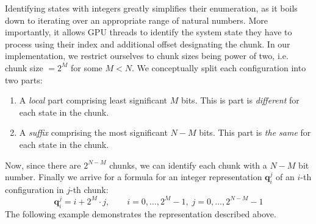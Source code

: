 Identifying states with integers greatly simplifies their enumeration, as it
boils down to iterating over an appropriate range of natural numbers. More
importantly, it allows GPU threads to identify the system state they have to
process using their index and additional offset designating the chunk. In our
implementation, we restrict ourselves to chunk sizes being power of two, i.e.
chunk size $=2^{M}$ for some $M < N$. We conceptually split each configuration
    into two parts:
    \begin{enumerate}
      \item A \emph{local} part comprising least significant $M$ bits. This is part is
        \emph{different} for each state in the chunk.
      \item A \emph{suffix} comprising the most significant $N-M$ bits. This part is
        \emph{the same} for each state in the chunk.
    \end{enumerate}
    Now, since there are $2^{N-M}$ chunks, we can identify each chunk with a $N-M$
    bit number. Finally we arrive for a formula for an integer representation
  $\mathbf{q}_{i}^{j}$ of an $i$-th configuration in $j$-th chunk:
\begin{equation}
  \mathbf{q}_{i}^{j} = i + 2^{M}\cdot j,\qquad i=0,\ldots,2^{M}-1, \; j=0,\ldots,2^{N-M}-1
\end{equation}
The following example demonstrates the representation described above.
